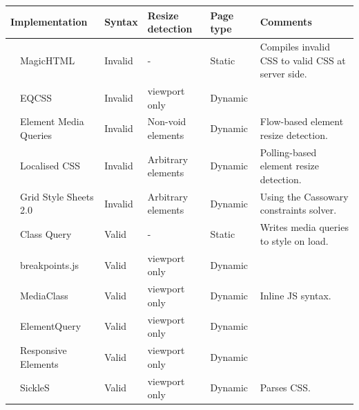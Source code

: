 \documentclass[a4paper,11pt]{kth-mag}
\begin{document}
    \begin{table}[ht]\center
      \tiny
      \begin{tabular}[t]{ l p{3cm} l l l p{3cm} }
        \multicolumn{2}{l}{Implementation} & Syntax & Resize detection & Page type & Comments \\
        \hline
        \cite{eq_imp_magichtml} &             MagicHTML &                                   Invalid &   - &                          Static &    Compiles invalid CSS to valid CSS at server side. \\
        \cite{eq_imp_eqcss} &                 EQCSS &                                       Invalid &   \Gls{viewport} only &        Dynamic     \\
        \cite{eq_imp_prollyfill-min-width} &  Element Media Queries &                       Invalid &   Non-void \glspl{element} &   Dynamic &   Flow-based element resize detection. \\
        \cite{eq_imp_localised-css} &         Localised CSS &                               Invalid &   Arbitrary \glspl{element} &  Dynamic &   Polling-based element resize detection. \\
        \cite{eq_imp_gss} &                   Grid Style Sheets 2.0 &                       Invalid &   Arbitrary \glspl{element} &  Dynamic &   Using the Cassowary constraints solver. \\
        \cite{eq_imp_classquery} &            Class Query &                                 Valid &     - &                          Static &    Writes \gls{media queries} to style on load. \\
        \cite{eq_imp_breakpointsjs} &         breakpoints.js &                              Valid &     \Gls{viewport} only &        Dynamic &   \\
        \cite{eq_imp_mediaclass} &            MediaClass &                                  Valid &     \Gls{viewport} only &        Dynamic &   Inline JS syntax. \\
        \cite{eq_imp_elementquery} &          ElementQuery &                                Valid &     \Gls{viewport} only &        Dynamic &   \\
        \cite{eq_imp_responsive-elements} &   Responsive Elements &                         Valid &     \Gls{viewport} only &        Dynamic &   \\
        \cite{eq_imp_sickles} &               SickleS &                                     Valid &     \Gls{viewport} only &        Dynamic &   Parses CSS. \\

\end{tabular}
\end{table}
\end{document}
